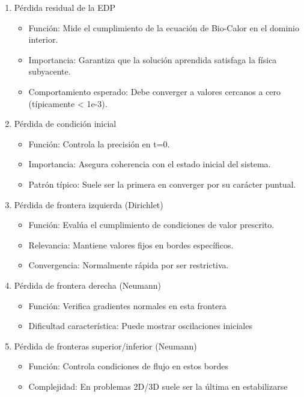\documentclass[
  spanish,
  us-letterpaper,
]{scrreprt}
\providecommand{\tightlist}{%
  \setlength{\itemsep}{0pt}\setlength{\parskip}{0pt}}
\theoremstyle{definition}
\theoremstyle{plain}
\theoremstyle{remark}
\begin{document}
\begin{enumerate}
\def\labelenumi{\arabic{enumi}.}
\tightlist
\item
  Pérdida residual de la EDP

  \begin{itemize}
  \tightlist
  \item
    Función: Mide el cumplimiento de la ecuación de Bio-Calor en el
    dominio interior.
  \item
    Importancia: Garantiza que la solución aprendida satisfaga la física
    subyacente.
  \item
    Comportamiento esperado: Debe converger a valores cercanos a cero
    (típicamente \textless{} 1e-3).
  \end{itemize}
\item
  Pérdida de condición inicial

  \begin{itemize}
  \tightlist
  \item
    Función: Controla la precisión en t=0.
  \item
    Importancia: Asegura coherencia con el estado inicial del sistema.
  \item
    Patrón típico: Suele ser la primera en converger por su carácter
    puntual.
  \end{itemize}
\item
  Pérdida de frontera izquierda (Dirichlet)

  \begin{itemize}
  \tightlist
  \item
    Función: Evalúa el cumplimiento de condiciones de valor prescrito.
  \item
    Relevancia: Mantiene valores fijos en bordes específicos.
  \item
    Convergencia: Normalmente rápida por ser restrictiva.
  \end{itemize}
\item
  Pérdida de frontera derecha (Neumann)

  \begin{itemize}
  \tightlist
  \item
    Función: Verifica gradientes normales en esta frontera
  \item
    Dificultad característica: Puede mostrar oscilaciones iniciales
  \end{itemize}
\item
  Pérdida de fronteras superior/inferior (Neumann)

  \begin{itemize}
  \tightlist
  \item
    Función: Controla condiciones de flujo en estos bordes
  \item
    Complejidad: En problemas 2D/3D suele ser la última en estabilizarse
  \end{itemize}
\end{enumerate}
\end{document}
